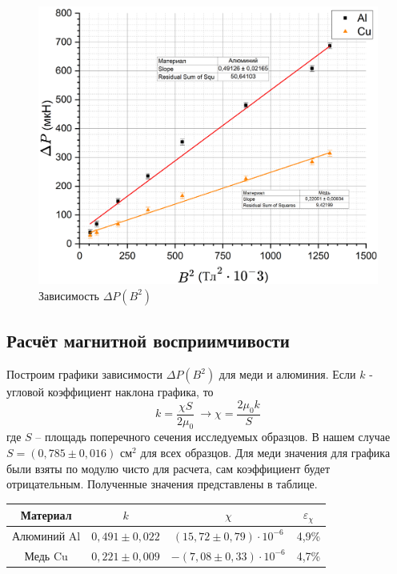 \documentclass[a4paper, 12pt]{article}
\begin{document}
	\begin{figure}[h!]
		\centering
		\includegraphics[width = \textwidth]{Main}
		\caption{Зависимость $\Delta P(B^2)$}
	\end{figure}

	\subsection*{Расчёт магнитной восприимчивости}
	Построим графики зависимости $\Delta P(B^2)$ для меди и алюминия. Если $k$ - угловой коэффициент наклона графика, то
	\[k = \frac{\chi S}{2\mu_0} \ \rightarrow \chi = \frac{2\mu_0 k}{S}\]
	где $ S $ -- площадь поперечного сечения исследуемых образцов. В нашем случае $ S = (0,785 \pm 0,016) $ см$ ^2 $ для всех образцов.
	Для меди значения для графика были взяты по модулю чисто для расчета, сам коэффициент будет отрицательным. Полученные значения представлены в таблице.

	
	\begin{table}[h!]
		\centering
		\begin{tabular}{|c|c|c|c|}
			\hline
			Материал & $k$ & $\chi$ & $\varepsilon_{\chi}$ \\ \hline
			Алюминий Al & $0,491 \pm 0,022$ & $(15,72 \pm 0,79) \cdot 10^{-6}$ & 4,9\% \\ \hline
			Медь Cu & $0,221 \pm 0,009$ & $-(7,08 \pm 0,33) \cdot 10^{-6}$ & 4,7\% \\ \hline
		\end{tabular}
	\end{table}
	\newpage
\end{document}

